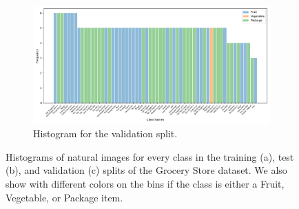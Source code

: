 \begin{figure}[ht!]
\begin{minipage}{0.95\textwidth}
\begin{subfigure}[t]{0.82\linewidth}
		\end{subfigure} \\
        \begin{subfigure}[t]{0.82\linewidth}
			\centering
			\includegraphics[width=\textwidth]{PaperB/appendix/figures/class_distributions_histogram/class_dist_val.png}
			\caption{Histogram for the validation split.}
			\label{fig:class_distribution_val}
		\end{subfigure} 
    \end{minipage}
    \caption{Histograms of natural images for every class in the training (a), test (b), and validation (c) splits of the Grocery Store dataset. We also show with different colors on the bins if the class is either a Fruit, Vegetable, or Package item.}
    \label{fig:histograms}
\end{figure}
\clearpage

